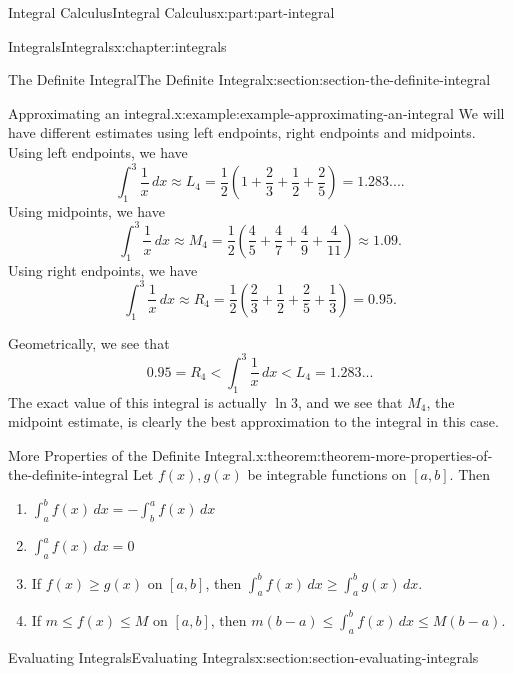 \documentclass[twoside,10pt,]{book}
\numberwithin{equation}{part}
\begin{document}
\begin{partptx}{Integral Calculus}{}{Integral Calculus}{}{}{x:part:part-integral}
\begin{chapterptx}{Integrals}{}{Integrals}{}{}{x:chapter:integrals}
\begin{sectionptx}{The Definite Integral}{}{The Definite Integral}{}{}{x:section:section-the-definite-integral}
\begin{example}{Approximating an integral.}{x:example:example-approximating-an-integral}
We will have different estimates using left endpoints, right endpoints and midpoints. Using left endpoints, we have%
\begin{equation*}
\int_{1}^{3}\frac{1}{x}\,dx \approx L_{4} = \frac{1}{2}\left(1 + \frac{2}{3} + \frac{1}{2} + \frac{2}{5}\right) = 1.283....
\end{equation*}
Using midpoints, we have%
\begin{equation*}
\int_{1}^{3}\frac{1}{x}\,dx \approx M_{4} = \frac{1}{2}\left(\frac{4}{5} + \frac{4}{7} + \frac{4}{9} + \frac{4}{11}\right) \approx1.09.
\end{equation*}
Using right endpoints, we have%
\begin{equation*}
\int_{1}^{3}\frac{1}{x}\,dx \approx R_{4} = \frac{1}{2}\left(\frac{2}{3} + \frac{1}{2} + \frac{2}{5} + \frac{1}{3}\right) = 0.95.
\end{equation*}
%
\par
Geometrically, we see that%
\begin{equation*}
0.95 = R_{4} < \int_{1}^{3}\frac{1}{x}\,dx < L_{4} = 1.283...
\end{equation*}
The exact value of this integral is actually \(\ln 3\), and we see that \(M_{4}\), the midpoint estimate, is clearly the best approximation to the integral in this case.%
\end{example}
\begin{theorem}{More Properties of the Definite Integral.}{}{x:theorem:theorem-more-properties-of-the-definite-integral}%
Let \(f(x),g(x)\) be integrable functions on \([a,b]\). Then%
\begin{enumerate}
\item{}\(\displaystyle \int_{a}^{b}f(x)\,dx = - \int_{b}^{a}f(x)\,dx\)%
\item{}\(\displaystyle \int_{a}^{a}f(x)\,dx = 0\)%
\item{}If \(f(x)\geq g(x)\) on \([a,b]\), then \(\int_{a}^{b}f(x)\,dx \geq \int_{a}^{b}g(x)\,dx\).%
\item{}If \(m\leq f(x)\leq M\) on \([a,b]\), then \(m(b-a)\leq \int_{a}^{b}f(x)\,dx\leq M(b-a)\).%
\end{enumerate}
%
\end{theorem}
\end{sectionptx}
%
%
\typeout{************************************************}
\typeout{************************************************}
%
\begin{sectionptx}{Evaluating Integrals}{}{Evaluating Integrals}{}{}{x:section:section-evaluating-integrals}

\end{sectionptx}
\end{chapterptx}
\end{partptx}
\end{document}
